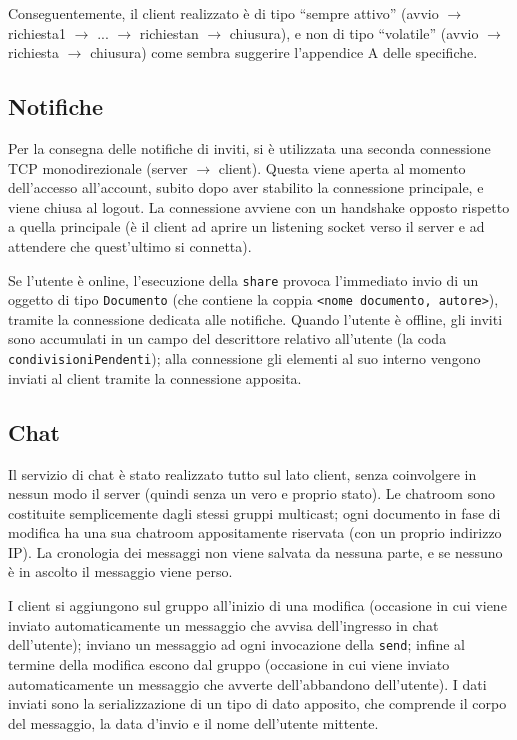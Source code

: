 \documentclass[a4paper,12pt]{article}
\begin{document}
 Conseguentemente, il client realizzato è di tipo ``sempre attivo'' (avvio $\rightarrow$ richiesta1 $\rightarrow$ ... $\rightarrow$ richiestan $\rightarrow$ chiusura), e non di tipo ``volatile'' (avvio $\rightarrow$ richiesta $\rightarrow$ chiusura) come sembra suggerire l'appendice A delle specifiche.
 
 \subsection*{ Notifiche }
 Per la consegna delle notifiche di inviti, si è utilizzata una seconda connessione TCP monodirezionale (server $\rightarrow$ client). Questa viene aperta al momento dell'accesso all'account, subito dopo aver stabilito la connessione principale, e viene chiusa al logout. La connessione avviene con un handshake opposto rispetto a quella principale (è il client ad aprire un listening socket verso il server e ad attendere che quest'ultimo si connetta).
 
 Se l'utente è online, l'esecuzione della \texttt{share} provoca l'immediato invio di un oggetto di tipo \texttt{Documento} (che contiene la coppia \texttt{<nome documento, autore>}), tramite la connessione dedicata alle notifiche. Quando l'utente è offline, gli inviti sono accumulati in un campo del descrittore relativo all'utente (la coda \texttt{condivisioniPendenti}); alla connessione gli elementi al suo interno vengono inviati al client tramite la connessione apposita.
 
 \subsection*{ Chat }
 Il servizio di chat è stato realizzato tutto sul lato client, senza coinvolgere in nessun modo il server (quindi senza un vero e proprio stato). Le chatroom sono costituite semplicemente dagli stessi gruppi multicast; ogni documento in fase di modifica ha una sua chatroom appositamente riservata (con un proprio indirizzo IP). La cronologia dei messaggi non viene salvata da nessuna parte, e se nessuno è in ascolto il messaggio viene perso.
 
 I client si aggiungono sul gruppo all'inizio di una modifica (occasione in cui viene inviato automaticamente un messaggio che avvisa dell'ingresso in chat dell'utente); inviano un messaggio ad ogni invocazione della \texttt{send}; infine al termine della modifica escono dal gruppo (occasione in cui viene inviato automaticamente un messaggio che avverte dell'abbandono dell'utente). I dati inviati sono la serializzazione di un tipo di dato apposito, che comprende il corpo del messaggio, la data d'invio e il nome dell'utente mittente.
 
\end{document}
